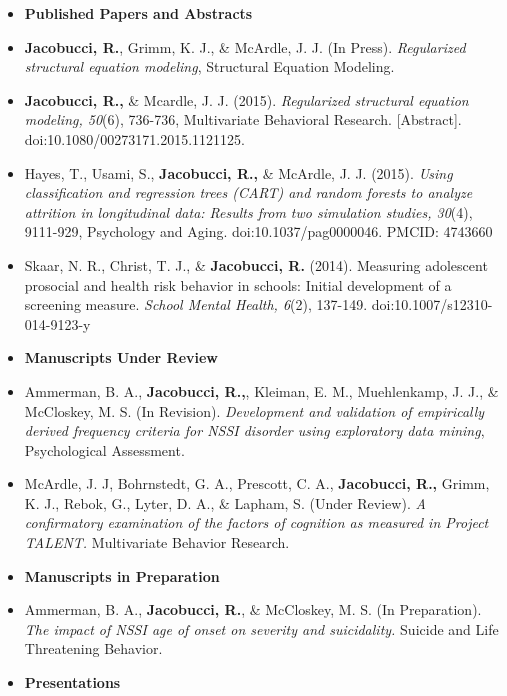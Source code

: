 \documentclass[letterpaper,10pt]{article}
\begin{document}
\begin{itemize}
\item[]{\textbf{\large{Published Papers and Abstracts}}}
%
\item[]\textbf{Jacobucci, R.}, Grimm, K. J., \& McArdle, J. J. (In Press). \emph{Regularized structural equation modeling}, Structural Equation Modeling.
%
\item[]\textbf{Jacobucci, R.,} \& Mcardle, J. J. (2015). \emph{Regularized structural equation modeling, 50}(6), 736-736, 
Multivariate Behavioral Research. [Abstract]. doi:10.1080/00273171.2015.1121125. 
%
\item[]Hayes, T., Usami, S., \textbf{Jacobucci, R.,} \& McArdle, J. J. (2015). \emph{Using classification and regression trees (CART) and random forests to analyze attrition in longitudinal data: Results from two simulation studies, 30}(4), 9111-929, Psychology and Aging. doi:10.1037/pag0000046. PMCID: 4743660
%
\item[]Skaar, N. R., Christ, T. J., \& \textbf{Jacobucci, R.} (2014). Measuring adolescent prosocial and health risk behavior in schools: Initial development of a screening measure. \emph{School Mental Health, 6}(2), 137-149. doi:10.1007/s12310-014-9123-y
%
\item[]{\textbf{\large{Manuscripts Under Review}}}
%
\item[]Ammerman, B. A., \textbf{Jacobucci, R.,}, Kleiman, E. M., Muehlenkamp, J. J., \& McCloskey, M. S. (In Revision). \emph{Development and validation of empirically derived frequency criteria for NSSI disorder using exploratory data mining}, Psychological Assessment.
%
\item[]McArdle, J. J, Bohrnstedt, G. A., Prescott, C. A., \textbf{Jacobucci, R.,} Grimm, K. J., Rebok, G., Lyter, D. A., \& Lapham, S. (Under Review). \emph{A confirmatory examination of the factors of cognition as measured in Project TALENT.} Multivariate Behavior Research.
%
\item[]{\textbf{\large{Manuscripts in Preparation}}}
%
\item[]Ammerman, B. A., \textbf{Jacobucci, R.}, \& McCloskey, M. S. (In Preparation). \emph{The impact of NSSI age of onset on severity and suicidality.} Suicide and Life Threatening Behavior.
%
%

%
\item[]{\textbf{\large{Presentations}}}
%


\end{itemize}
\end{document}
